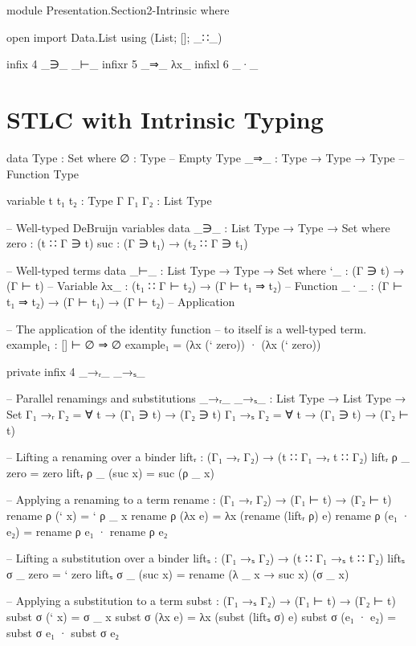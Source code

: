 \begin{code}[hide]
module Presentation.Section2-Intrinsic where

open import Data.List using (List; []; _∷_)

infix  4  _∋_  _⊢_
infixr 5  _⇒_  λx_
infixl 6  _·_
\end{code}

\newpage
\section{STLC with Intrinsic Typing}

\begin{code}
data Type : Set where
  ∅    : Type                -- Empty Type
  _⇒_  : Type → Type → Type  -- Function Type

variable
  t t₁ t₂  : Type
  Γ Γ₁ Γ₂  : List Type

-- Well-typed DeBruijn variables
data _∋_ : List Type → Type → Set where
  zero  : (t ∷ Γ ∋ t)
  suc   : (Γ ∋ t₁) → (t₂ ∷ Γ ∋ t₁)

-- Well-typed terms
data _⊢_ : List Type → Type → Set where
  `_   : (Γ ∋ t) → (Γ ⊢ t)                    -- Variable
  λx_  : (t₁ ∷ Γ ⊢ t₂) → (Γ ⊢ t₁ ⇒ t₂)        -- Function
  _·_  : (Γ ⊢ t₁ ⇒ t₂) → (Γ ⊢ t₁) → (Γ ⊢ t₂)  -- Application
\end{code}
%
\begin{code}[hide]
-- The application of the identity function
-- to itself is a well-typed term.
example₁ : [] ⊢ ∅ ⇒ ∅
example₁ = (λx (` zero)) · (λx (` zero))

private
  infix  4  _→ᵣ_  _→ₛ_
\end{code}
%
\begin{code}
  -- Parallel renamings and substitutions
  _→ᵣ_ _→ₛ_ : List Type → List Type → Set
  Γ₁ →ᵣ Γ₂ = ∀ t → (Γ₁ ∋ t) → (Γ₂ ∋ t)
  Γ₁ →ₛ Γ₂ = ∀ t → (Γ₁ ∋ t) → (Γ₂ ⊢ t)

  -- Lifting a renaming over a binder
  liftᵣ : (Γ₁ →ᵣ Γ₂) → (t ∷ Γ₁ →ᵣ t ∷ Γ₂)
  liftᵣ ρ _ zero     = zero
  liftᵣ ρ _ (suc x)  = suc (ρ _ x)

  -- Applying a renaming to a term
  rename : (Γ₁ →ᵣ Γ₂) → (Γ₁ ⊢ t) → (Γ₂ ⊢ t)
  rename ρ (` x)      = ` ρ _ x
  rename ρ (λx e)     = λx (rename (liftᵣ ρ) e)
  rename ρ (e₁ · e₂)  = rename ρ e₁ · rename ρ e₂

  -- Lifting a substitution over a binder
  liftₛ : (Γ₁ →ₛ Γ₂) → (t ∷ Γ₁ →ₛ t ∷ Γ₂)
  liftₛ σ _ zero     = ` zero
  liftₛ σ _ (suc x)  = rename (λ _ x → suc x) (σ _ x)

  -- Applying a substitution to a term
  subst : (Γ₁ →ₛ Γ₂) → (Γ₁ ⊢ t) → (Γ₂ ⊢ t)
  subst σ (` x)      = σ _ x
  subst σ (λx e)     = λx (subst (liftₛ σ) e)
  subst σ (e₁ · e₂)  = subst σ e₁ · subst σ e₂
\end{code}

